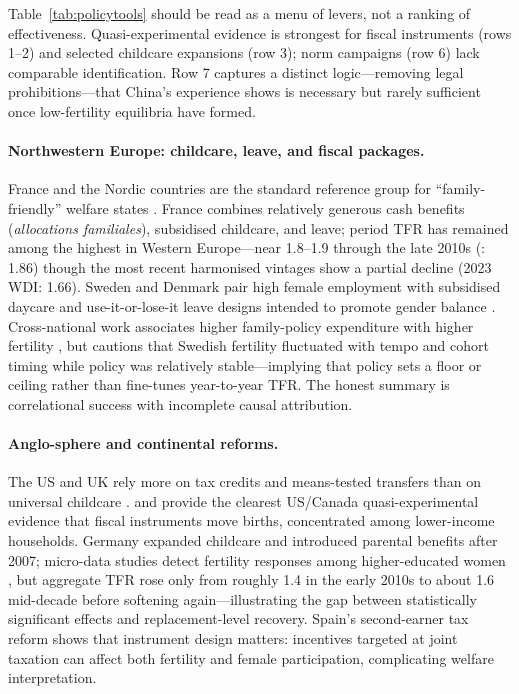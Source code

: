 \documentclass[11pt,a4paper,openany]{book}
\begin{document}
Table~\ref{tab:policytools} should be read as a menu of levers, not a ranking of effectiveness. Quasi-experimental evidence is strongest for fiscal instruments (rows 1--2) and selected childcare expansions (row 3); norm campaigns (row 6) lack comparable identification. Row 7 captures a distinct logic---removing legal prohibitions---that China's experience shows is necessary but rarely sufficient once low-fertility equilibria have formed.

\paragraph{Northwestern Europe: childcare, leave, and fiscal packages.}
France and the Nordic countries are the standard reference group for ``family-friendly'' welfare states \citep{castles2003,thevenon2011}. France combines relatively generous cash benefits (\emph{allocations familiales}), subsidised childcare, and leave; period TFR has remained among the highest in Western Europe---near 1.8--1.9 through the late 2010s (\SnapshotYear{}: 1.86) though the most recent harmonised vintages show a partial decline (2023 WDI: 1.66). Sweden and Denmark pair high female employment with subsidised daycare and use-it-or-lose-it leave designs intended to promote gender balance \citep{raute2019}. Cross-national work associates higher family-policy expenditure with higher fertility \citep{kalwij2010,luci2013}, but \citet{hoem2008} cautions that Swedish fertility fluctuated with tempo and cohort timing while policy was relatively stable---implying that policy sets a floor or ceiling rather than fine-tunes year-to-year TFR. The honest summary is correlational success with incomplete causal attribution.

\paragraph{Anglo-sphere and continental reforms.}
The US and UK rely more on tax credits and means-tested transfers than on universal childcare \citep{cohen2013,thevenon2011}. \citet{milligan2005} and \citet{cohen2013} provide the clearest US/Canada quasi-experimental evidence that fiscal instruments move births, concentrated among lower-income households. Germany expanded childcare and introduced parental benefits after 2007; micro-data studies detect fertility responses among higher-educated women \citep{stichnoth2015,raute2019}, but aggregate TFR rose only from roughly 1.4 in the early 2010s to about 1.6 mid-decade before softening again---illustrating the gap between statistically significant effects and replacement-level recovery. Spain's second-earner tax reform \citep{azmat2010} shows that instrument design matters: incentives targeted at joint taxation can affect both fertility and female participation, complicating welfare interpretation.
\end{document}

